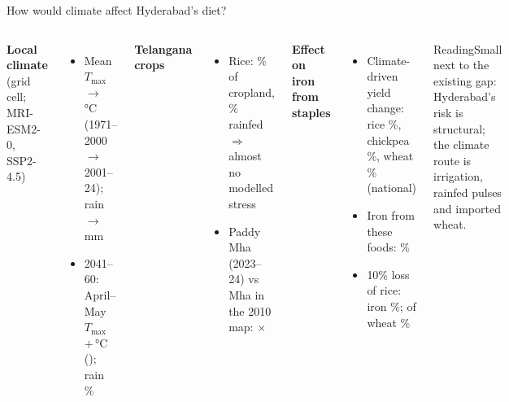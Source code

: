 \begin{frame}{How would climate affect Hyderabad's diet?}
\begin{columns}[T]
\small
\textbf{Local climate} (grid cell; MRI-ESM2-0, SSP2-4.5)
\begin{itemize}
\item Mean $T_{\max}$ \hydTmaxBase\,$\to$\,\hydTmaxRecent\,\si{\celsius} (1971--2000 $\to$ 2001--24); rain \hydRainBase\,$\to$\,\hydRainRecent\,mm
\item 2041--60: April--May $T_{\max}$ $+$\hydAMFutChange\,\si{\celsius} (\hydAMFutLevel); rain \hydRainFutRatio\%
\end{itemize}
\textbf{Telangana crops}
\begin{itemize}
\item Rice: \tgAreaRice\% of cropland, \tgRiceRainfed\% rainfed $\Rightarrow$ almost no modelled stress
\item Paddy \tgPaddyAreaMha\,Mha (2023--24) vs \tgPaddySpamMha\,Mha in the 2010 map: $\times$\tgPaddyGrowth
\end{itemize}
\small
\textbf{Effect on iron from staples}
\begin{itemize}
\item Climate-driven yield change: rice \hqdYRice\%, chickpea \hqdYChickpea\%, wheat \hqdYWheat\% (national)
\item Iron from these foods: \hqIronChangeUrban\%
\item 10\% loss of rice: iron \hqIronTenRiceUrban\%; of wheat \hqIronTenWheatUrban\%
\end{itemize}
\begin{block}{Reading}Small next to the existing gap: Hyderabad's risk is structural; the climate route is irrigation, rainfed pulses and imported wheat.\end{block}
\end{columns}
\end{frame}
